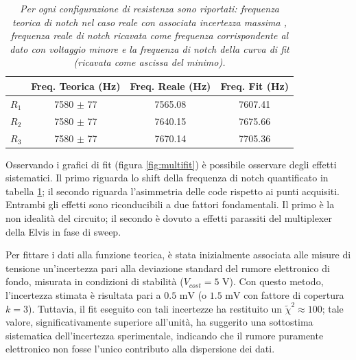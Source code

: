 \documentclass[12pt]{article}
\numberwithin{equation}{section}
\begin{document}
\begin{table}[H]
\centering
\begin{tabular}{|| c | c | c | c ||} 
 \hline
  & Freq. Teorica (Hz) & Freq. Reale (Hz) & Freq. Fit (Hz)\\ [0.5ex] 
 \hline\hline
 $R_1$ & 7580 $\pm$ 77 & 7565.08 & 7607.41\\
 \hline
 $R_2$ & 7580 $\pm$ 77 & 7640.15 & 7675.66\\ 
 \hline
 $R_3$ & 7580 $\pm$ 77 & 7670.14 & 7705.36\\
 \hline
\end{tabular}
\caption{\textit{Per ogni configurazione di resistenza sono riportati: frequenza teorica di notch nel caso reale con associata incertezza massima \cite{Taylor}, frequenza reale di notch ricavata come frequenza corrispondente al dato con voltaggio minore e la frequenza di notch della curva di fit (ricavata come ascissa del minimo).}}
\label{tab:freq}
\end{table}

Osservando i grafici di fit (figura \ref{fig:multifit}) è possibile osservare degli effetti sistematici. Il primo riguarda lo shift della frequenza di notch quantificato in tabella \ref{tab:freq}; il secondo riguarda l'asimmetria delle code rispetto ai punti acquisiti. Entrambi gli effetti sono riconducibili a due fattori fondamentali. Il primo è la non idealità del circuito; il secondo è dovuto a effetti parassiti del multiplexer della Elvis in fase di sweep.

Per fittare i dati alla funzione teorica, è stata inizialmente associata alle misure di tensione un'incertezza pari alla deviazione standard del rumore elettronico di fondo, misurata in condizioni di stabilità ($V_{cost} = 5\text{ V}$). Con questo metodo, l'incertezza stimata è risultata pari a $0.5\text{ mV}$ (o $1.5\text{ mV}$ con fattore di copertura $k=3$). Tuttavia, il fit eseguito con tali incertezze ha restituito un $\widetilde{\chi}^2 \approx 100$; tale valore, significativamente superiore all'unità, ha suggerito una sottostima sistematica dell'incertezza sperimentale, indicando che il rumore puramente elettronico non fosse l'unico contributo alla dispersione dei dati. 
\end{document}
